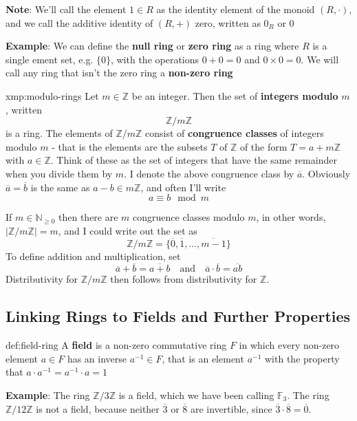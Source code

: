 \documentclass{article}
\begin{document}
\textbf{Note}: We'll call the element $1\in R$ as the identity element of the monoid $(R, \cdot)$, and we call the additive identity of $(R, +)$ zero, written as $0_{R}$ or $0$

\textbf{Example}: We can define the \textbf{null ring} or \textbf{zero ring} as a ring where $R$ is a single ement set, e.g. $\{0\}$, with the operations $0 + 0 = 0$ and $0 \times 0 = 0$. We will call any ring that isn't the zero ring a \textbf{non-zero ring}

\begin{xmp}{xmp:modulo-rings}{}
    Let $m\in \mathbb{Z}$ be an integer. Then the set of \textbf{integers modulo} $m$, written
    \[\mathbb{Z} / m\mathbb{Z}\]
    is a ring. The elements of $\mathbb{Z} / m\mathbb{Z}$ consist of \textbf{congruence classes} of integers modulo $m$ - that is the elements are the subsets $T$ of $\mathbb{Z}$ of the form $T = a + m\mathbb{Z}$ with $a\in \mathbb{Z}$. Think of these as the set of integers that have the same remainder when you divide them by $m$. I denote the above congruence class by $\overline{a}$. Obviously $\overline{a} = \overline{b}$ is the same as $a-b\in m\mathbb{Z}$, and often I'll write
    \[a \equiv b \mod m\]
\end{xmp}

If $m\in \mathbb{N}_{\ge 0}$ then there are $m$ congruence classes modulo $m$, in other words, $\lvert \mathbb{Z} / m\mathbb{Z} \rvert = m$, and I could write out the set as
\[\mathbb{Z} / m\mathbb{Z} = \{\overline{0}, \overline{1},\dots,\overline{m - 1}\}\]
To define addition and multiplication, set
\[\overline{a} + \overline{b} = \overline{a + b} \quad \text{and} \quad \overline{a} \cdot \overline{b} = \overline{ab}\]
Distributivity for $\mathbb{Z} / m\mathbb{Z}$ then follows from distributivity for $\mathbb{Z}$.

\newpage
\subsection{Linking Rings to Fields and Further Properties}

\begin{dfn}{def:field-ring}{}
    A \textbf{field} is a non-zero commutative ring $F$ in which every non-zero element $a\in F$ has an inverse $a^{-1}\in F$, that is an element $a^{-1}$ with the property that $a \cdot a^{-1} = a^{-1} \cdot a = 1$
\end{dfn}

\textbf{Example}: The ring $\mathbb{Z} / 3\mathbb{Z}$ is a field, which we have been calling $\mathbb{F}_{3}$. The ring $\mathbb{Z} / 12\mathbb{Z}$ is not a field, because neither $\overline{3}$ or $\overline{8}$ are invertible, since $\overline{3} \cdot \overline{8} = \overline{0}$.
\end{document}
